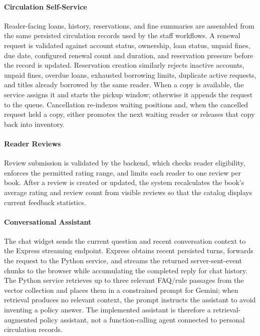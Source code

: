 \paragraph{Circulation Self-Service}
Reader-facing loans, history, reservations, and fine summaries are assembled from the same persisted circulation records used by the staff workflows. A renewal request is validated against account status, ownership, loan status, unpaid fines, due date, configured renewal count and duration, and reservation pressure before the record is updated. Reservation creation similarly rejects inactive accounts, unpaid fines, overdue loans, exhausted borrowing limits, duplicate active requests, and titles already borrowed by the same reader. When a copy is available, the service assigns it and starts the pickup window; otherwise it appends the request to the queue. Cancellation re-indexes waiting positions and, when the cancelled request held a copy, either promotes the next waiting reader or releases that copy back into inventory.

\paragraph{Reader Reviews}
Review submission is validated by the backend, which checks reader eligibility, enforces the permitted rating range, and limits each reader to one review per book. After a review is created or updated, the system recalculates the book's average rating and review count from visible reviews so that the catalog displays current feedback statistics.

\paragraph{Conversational Assistant}
The chat widget sends the current question and recent conversation context to the Express streaming endpoint. Express obtains recent persisted turns, forwards the request to the Python service, and streams the returned server-sent-event chunks to the browser while accumulating the completed reply for chat history. The Python service retrieves up to three relevant FAQ/rule passages from the vector collection and places them in a constrained prompt for Gemini; when retrieval produces no relevant context, the prompt instructs the assistant to avoid inventing a policy answer. The implemented assistant is therefore a retrieval-augmented policy assistant, not a function-calling agent connected to personal circulation records.




